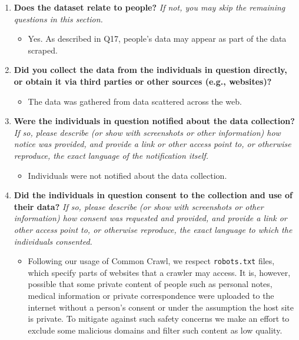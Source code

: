 \documentclass{article}
\newcommand{\commoncrawl}{Common Crawl\xspace}
\begin{document}
\begin{enumerate}[label=Q\arabic*, resume]
\item \textbf{Does the dataset relate to people?} \textit{If not, you may skip the remaining questions in this section.}

\begin{itemize}
\item Yes. As described in Q17, people's data may appear as part of the data scraped.
\end{itemize}

\item \textbf{Did you collect the data from the individuals in question directly, or obtain it via third parties or other sources (e.g., websites)?}

\begin{itemize}
\item The data was gathered from data scattered across the web.
\end{itemize}

\item \textbf{Were the individuals in question notified about the data collection?} \textit{If so, please describe (or show with screenshots or other information) how notice was provided, and provide a link or other access point to, or otherwise reproduce, the exact language of the notification itself.}

\begin{itemize}
\item Individuals were not notified about the data collection.
\end{itemize}

\item \textbf{Did the individuals in question consent to the collection and use of their data?} \textit{If so, please describe (or show with screenshots or other information) how consent was requested and provided, and provide a link or other access point to, or otherwise reproduce, the exact language to which the individuals consented.}

\begin{itemize}
\item Following our usage of \commoncrawl, we respect \texttt{robots.txt} files, which specify parts of websites that a crawler may access. It is, however, possible that some private content of people such as personal notes, medical information or private correspondence were uploaded to the internet without a person's consent or under the assumption the host site is private. To mitigate against such safety concerns we make an effort to exclude some malicious domains and filter such content as low quality.
\end{itemize}


\end{enumerate}
\end{document}
